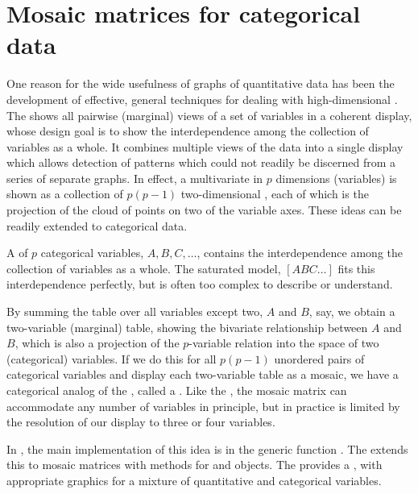 \documentclass[11pt]{book}
\begin{document}
\section{Mosaic matrices for categorical data}\label{sec:mosmat}

One reason for the wide usefulness of graphs of quantitative data
has been the
development of effective, general techniques for dealing with high-dimensional \Dsets.
The 
shows all pairwise (marginal) views of a set of variables
in a coherent display, whose design goal is to show the interdependence
among the collection of variables as a whole.
It combines multiple views of the data
into a single display which allows detection of patterns which could
not readily be discerned from a series of separate graphs.
In effect, a multivariate \Dset in $p$ dimensions (variables) is shown as
a collection of $p (p-1)$ two-dimensional \scats, each of which is
the projection of the cloud of points on two of the variable axes.
These ideas can be readily extended to categorical data.

A \mway \ctab of $p$ categorical variables,
$A, B, C,\dots$, contains the interdependence among the collection
of variables as a whole.  The saturated \loglin model, $[A B C\dots]$
fits this interdependence perfectly, but is often too complex to describe
or understand.  

By summing the table over all variables except two,
$A$ and $B$, say, we obtain a two-variable (marginal) table, showing the
bivariate relationship between $A$ and $B$, which is also a projection
of the $p$-variable relation into the space of two (categorical) variables.
If we do this for all $p (p-1)$ unordered pairs of categorical variables
and display each two-variable table as a mosaic,  we have a categorical
analog of the \scatmat, called a
.
Like the \scatmat, the mosaic matrix can accommodate any number of
variables in principle, but in practice is limited by the resolution
of our display to three or four variables.

In \R, the main implementation of this idea is in the generic function
.  The  extends this to 
mosaic matrices with methods 
for  and  objects.
The  provides a ,
with appropriate graphics for a mixture of quantitative and categorical
variables.
\end{document}
